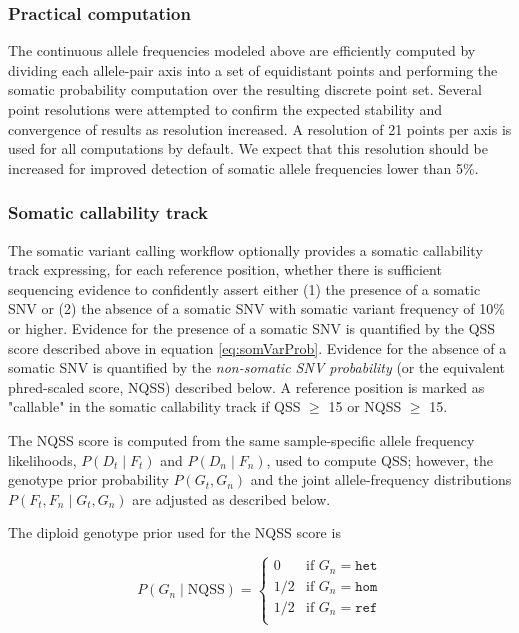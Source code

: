 \documentclass{article}
\begin{document}
\subsubsection{Practical computation}

The continuous allele frequencies modeled above are efficiently computed by dividing each allele-pair axis into a set of equidistant points and performing the somatic probability computation over the resulting discrete point set. Several point resolutions were attempted to confirm the expected stability and convergence of results as resolution increased. A resolution of 21 points per axis is used for all computations by default. We expect that this resolution should be increased for improved detection of somatic allele frequencies lower than 5\%.

\subsubsection{Somatic callability track}

The somatic variant calling workflow optionally provides a somatic callability track expressing, for each reference position, whether there is sufficient sequencing evidence to confidently assert either (1) the presence of a somatic SNV or (2) the absence of a somatic SNV with somatic variant frequency of 10\% or higher. Evidence for the presence of a somatic SNV is quantified by the QSS score described above in equation \ref{eq:somVarProb}. Evidence for the absence of a somatic SNV is quantified by the \emph{non-somatic SNV probability} (or the equivalent phred-scaled score, NQSS) described below. A reference position is marked as "callable" in the somatic callability track if QSS $\ge$ 15 or NQSS $\ge$ 15.

The NQSS score is computed from the same sample-specific allele frequency likelihoods, $P(D_t \mid F_t)$ and $P(D_n \mid F_n)$, used to compute QSS; however, the genotype prior probability $P(G_t, G_n)$ and the joint allele-frequency distributions $P(F_t,F_n \mid G_t,G_n)$ are adjusted as described below.

The diploid genotype prior used for the NQSS score is

\begin{equation*}
P(G_n\mid \text{NQSS})=
\begin{cases}
0 & \text{if } G_n = \texttt{het} \\
1/2 & \text{if } G_n = \texttt{hom} \\
1/2 & \text{if } G_n = \texttt{ref} \\
\end{cases}
\end{equation*}
\end{document}
